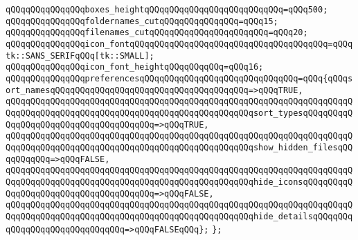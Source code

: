 \verb|qQQqqQQqqQQqqQQqboxes_heightqQQqqQQqqQQqqQQqqQQqqQQqqQQq=qQQq500;|\newline
\verb|qQQqqQQqqQQqqQQqfoldernames_cutqQQqqQQqqQQqqQQq=qQQq15;|\newline
\verb|qQQqqQQqqQQqqQQqfilenames_cutqQQqqQQqqQQqqQQqqQQqqQQq=qQQq20;|\newline
\verb|qQQqqQQqqQQqqQQqicon_fontqQQqqQQqqQQqqQQqqQQqqQQqqQQqqQQqqQQqqQQq=qQQqtk::SANS_SERIFqQQq[tk::SMALL];|\newline
\verb|qQQqqQQqqQQqqQQqicon_font_heightqQQqqQQqqQQq=qQQq16;|\newline
\verb|qQQqqQQqqQQqqQQqpreferencesqQQqqQQqqQQqqQQqqQQqqQQqqQQqqQQq=qQQq{qQQqsort_namesqQQqqQQqqQQqqQQqqQQqqQQqqQQqqQQqqQQqqQQq=>qQQqTRUE,|\newline
\verb|qQQqqQQqqQQqqQQqqQQqqQQqqQQqqQQqqQQqqQQqqQQqqQQqqQQqqQQqqQQqqQQqqQQqqQQqqQQqqQQqqQQqqQQqqQQqqQQqqQQqqQQqqQQqqQQqqQQqqQQqsort_typesqQQqqQQqqQQqqQQqqQQqqQQqqQQqqQQqqQQqqQQq=>qQQqTRUE,|\newline
\verb|qQQqqQQqqQQqqQQqqQQqqQQqqQQqqQQqqQQqqQQqqQQqqQQqqQQqqQQqqQQqqQQqqQQqqQQqqQQqqQQqqQQqqQQqqQQqqQQqqQQqqQQqqQQqqQQqqQQqqQQqshow_hidden_filesqQQqqQQqqQQq=>qQQqFALSE,|\newline
\verb|qQQqqQQqqQQqqQQqqQQqqQQqqQQqqQQqqQQqqQQqqQQqqQQqqQQqqQQqqQQqqQQqqQQqqQQqqQQqqQQqqQQqqQQqqQQqqQQqqQQqqQQqqQQqqQQqqQQqqQQqhide_iconsqQQqqQQqqQQqqQQqqQQqqQQqqQQqqQQqqQQqqQQq=>qQQqFALSE,|\newline
\verb|qQQqqQQqqQQqqQQqqQQqqQQqqQQqqQQqqQQqqQQqqQQqqQQqqQQqqQQqqQQqqQQqqQQqqQQqqQQqqQQqqQQqqQQqqQQqqQQqqQQqqQQqqQQqqQQqqQQqqQQqhide_detailsqQQqqQQqqQQqqQQqqQQqqQQqqQQqqQQq=>qQQqFALSEqQQq};|\newline
\verb|};|\newline

